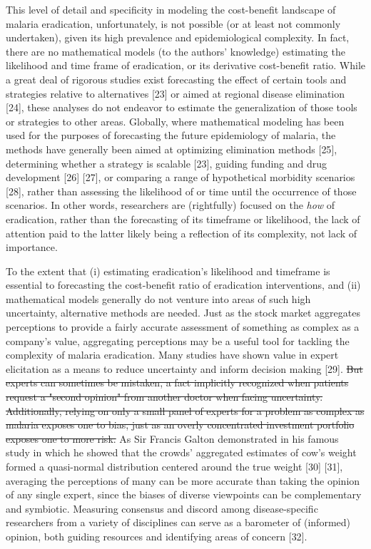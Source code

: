\documentclass[]{article}
\begin{document}
This level of detail and specificity in modeling the cost-benefit
landscape of malaria eradication, unfortunately, is not possible (or at
least not commonly undertaken), given its high prevalence and
epidemiological complexity. In fact, there are no mathematical models
(to the authors' knowledge) estimating the likelihood and time frame of
eradication, or its derivative cost-benefit ratio. While a great deal of
rigorous studies exist forecasting the effect of certain tools and
strategies relative to alternatives {[}23{]} or aimed at regional
disease elimination {[}24{]}, these analyses do not endeavor to estimate
the generalization of those tools or strategies to other areas.
Globally, where mathematical modeling has been used for the purposes of
forecasting the future epidemiology of malaria, the methods have
generally been aimed at optimizing elimination methods {[}25{]},
determining whether a strategy is scalable {[}23{]}, guiding funding and
drug development {[}26{]} {[}27{]}, or comparing a range of hypothetical
morbidity scenarios {[}28{]}, rather than assessing the likelihood of or
time until the occurrence of those scenarios. In other words,
researchers are (rightfully) focused on the \emph{how} of eradication,
rather than the forecasting of its timeframe or likelihood, the lack of
attention paid to the latter likely being a reflection of its
complexity, not lack of importance.

To the extent that (i) estimating eradication's likelihood and timeframe
is essential to forecasting the cost-benefit ratio of eradication
interventions, and (ii) mathematical models generally do not venture
into areas of such high uncertainty, alternative methods are needed.
Just as the stock market aggregates perceptions to provide a fairly
accurate assessment of something as complex as a company's value,
aggregating perceptions may be a useful tool for tackling the complexity
of malaria eradication. Many studies have shown value in expert
elicitation as a means to reduce uncertainty and inform decision making
{[}29{]}.
\st{But experts can sometimes be mistaken, a fact implicitly recognized when patients request a "second opinion" from another doctor when facing uncertainty. Additionally, relying on only a small panel of experts for a problem as complex as malaria exposes one to bias, just as an overly concentrated investment portfolio exposes one to more risk.}
As Sir Francis Galton demonstrated in his famous study in which he
showed that the crowds' aggregated estimates of cow's weight formed a
quasi-normal distribution centered around the true weight {[}30{]}
{[}31{]}, averaging the perceptions of many can be more accurate than
taking the opinion of any single expert, since the biases of diverse
viewpoints can be complementary and symbiotic. Measuring consensus and
discord among disease-specific researchers from a variety of disciplines
can serve as a barometer of (informed) opinion, both guiding resources
and identifying areas of concern {[}32{]}.
\end{document}
